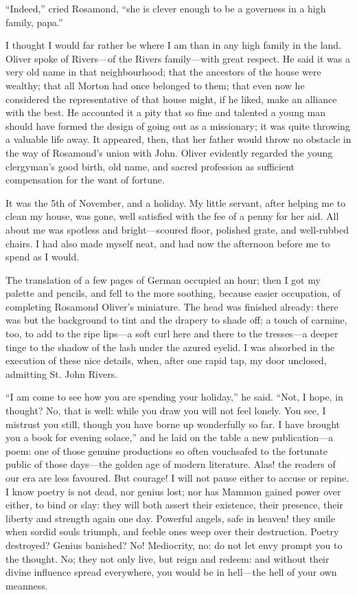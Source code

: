 \enquote{Indeed,} cried Rosamond, \enquote{she is clever enough to be a
	governess in a high family, papa.}

I thought I would far rather be where I am than in any high family in
the land. \Mr{} Oliver spoke of \Mr{} Rivers---of the Rivers family---with
great respect. He said it was a very old name in that neighbourhood;
that the ancestors of the house were wealthy; that all Morton had once
belonged to them; that even now he considered the representative of that
house might, if he liked, make an alliance with the best. He accounted
it a pity that so fine and talented a young man should have formed the
design of going out as a missionary; it was quite throwing a valuable
life away. It appeared, then, that her father would throw no obstacle
in the way of Rosamond's union with \St{} John. \Mr{} Oliver evidently
regarded the young clergyman's good birth, old name, and sacred
profession as sufficient compensation for the want of fortune.

It was the 5th of November, and a holiday. My little servant, after
helping me to clean my house, was gone, well satisfied with the fee of a
penny for her aid. All about me was spotless and bright---scoured
floor, polished grate, and well-rubbed chairs. I had also made myself
neat, and had now the afternoon before me to spend as I would.

The translation of a few pages of German occupied an hour; then I got my
palette and pencils, and fell to the more soothing, because easier
occupation, of completing Rosamond Oliver's miniature. The head was
finished already: there was but the background to tint and the drapery
to shade off; a touch of carmine, too, to add to the ripe lips---a soft
curl here and there to the tresses---a deeper tinge to the shadow of the
lash under the azured eyelid. I was absorbed in the execution of these
nice details, when, after one rapid tap, my door unclosed, admitting St.
John Rivers.

\enquote{I am come to see how you are spending your holiday,} he said.
\enquote{Not, I hope, in thought? No, that is well: while you draw you
	will not feel lonely. You see, I mistrust you still, though you have
	borne up wonderfully so far. I have brought you a book for evening
	solace,} and he laid on the table a new publication---a poem: one of
those genuine productions so often vouchsafed to the fortunate public of
those days---the golden age of modern literature. Alas! the readers of
our era are less favoured. But courage! I will not pause either to
accuse or repine. I know poetry is not dead, nor genius lost; nor has
Mammon gained power over either, to bind or slay: they will both assert
their existence, their presence, their liberty and strength again one
day. Powerful angels, safe in heaven! they smile when sordid souls
triumph, and feeble ones weep over their destruction. Poetry
destroyed? Genius banished? No! Mediocrity, no: do not let envy
prompt you to the thought. No; they not only live, but reign and
redeem: and without their divine influence spread everywhere, you would
be in hell---the hell of your own meanness.

